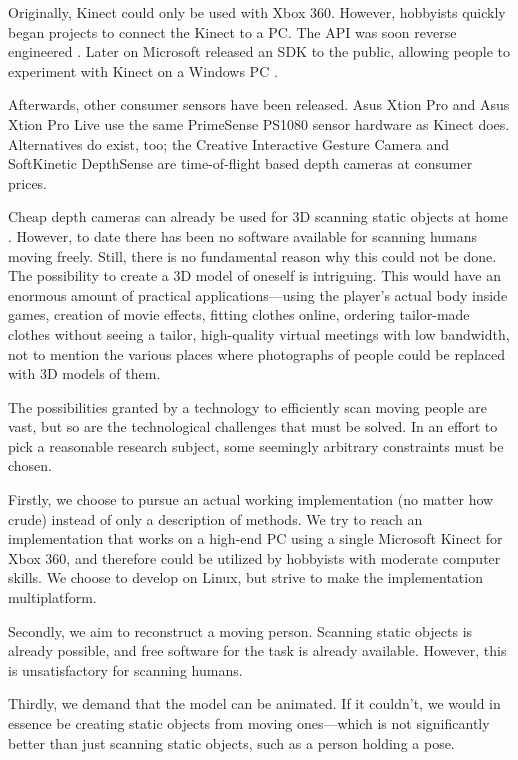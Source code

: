 Originally, Kinect could only be used with Xbox 360. However, hobbyists quickly began projects to connect the Kinect to a PC. The API was soon reverse engineered \citep{openkinect}. Later on Microsoft released an SDK to the public, allowing people to experiment with Kinect on a Windows PC \citep{KinectSDK}.

Afterwards, other consumer sensors have been released. Asus Xtion Pro and Asus Xtion Pro Live use the same PrimeSense PS1080 sensor hardware as Kinect does. Alternatives do exist, too; the Creative Interactive Gesture Camera and SoftKinetic DepthSense are time-of-flight based depth cameras at consumer prices.

Cheap depth cameras can already be used for 3D scanning static objects at home \autocites{newcombe2011kinectfusion}{izadi2011kinectfusion}. However, to date there has been no software available for scanning humans moving freely. Still, there is no fundamental reason why this could not be done. The possibility to create a 3D model of oneself is intriguing. This would have an enormous amount of practical applications---using the player's actual body inside games, creation of movie effects, fitting clothes online, ordering tailor-made clothes without seeing a tailor, high-quality virtual meetings with low bandwidth, not to mention the various places where photographs of people could be replaced with 3D models of them.

The possibilities granted by a technology to efficiently scan moving people are vast, but so are the technological challenges that must be solved. In an effort to pick a reasonable research subject, some seemingly arbitrary constraints must be chosen.

Firstly, we choose to pursue an actual working implementation (no matter how crude) instead of only a description of methods. We try to reach an implementation that works on a high-end PC using a single Microsoft Kinect for Xbox 360, and therefore could be utilized by hobbyists with moderate computer skills. We choose to develop on Linux, but strive to make the implementation multiplatform.

Secondly, we aim to reconstruct a moving person. Scanning static objects is already possible, and free software for the task is already available. However, this is unsatisfactory for scanning humans.

Thirdly, we demand that the model can be animated. If it couldn't, we would in essence be creating static objects from moving ones---which is not significantly better than just scanning static objects, such as a person holding a pose.

